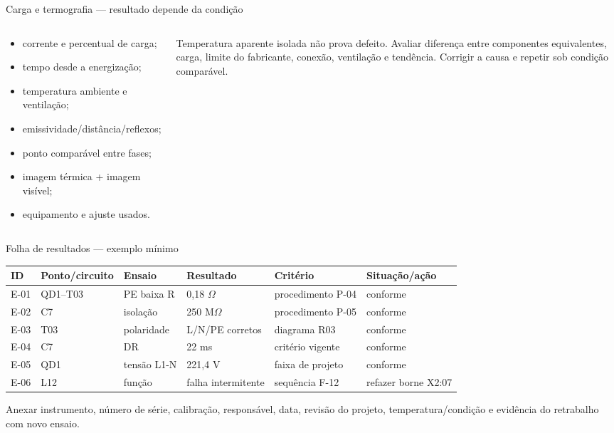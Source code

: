 \begin{frame}{Carga e termografia — resultado depende da condição}
\small
\begin{columns}[T,onlytextwidth]
\begin{caixaNorma}[title=Registrar a condição]
\begin{itemize}
\item corrente e percentual de carga;
\item tempo desde a energização;
\item temperatura ambiente e ventilação;
\item emissividade/distância/reflexos;
\item ponto comparável entre fases;
\item imagem térmica + imagem visível;
\item equipamento e ajuste usados.
\end{itemize}
\end{caixaNorma}
\begin{caixaAt}[title=Não concluir pelo “ponto vermelho”]
Temperatura aparente isolada não prova defeito. Avaliar diferença entre componentes equivalentes, carga, limite do fabricante, conexão, ventilação e tendência. Corrigir a causa e repetir sob condição comparável.
\end{caixaAt}
\end{columns}
\end{frame}

\begin{frame}{Folha de resultados — exemplo mínimo}
\scriptsize
\begin{tabularx}{\textwidth}{p{1.2cm}p{2.1cm}p{1.8cm}p{1.8cm}p{1.8cm}X}
\toprule
ID & Ponto/circuito & Ensaio & Resultado & Critério & Situação/ação \\
\midrule
E-01 & QD1--T03 & PE baixa R & 0,18 $\Omega$ & procedimento P-04 & conforme \\
E-02 & C7 & isolação & 250 M$\Omega$ & procedimento P-05 & conforme \\
E-03 & T03 & polaridade & L/N/PE corretos & diagrama R03 & conforme \\
E-04 & C7 & DR & 22 ms & critério vigente & conforme \\
E-05 & QD1 & tensão L1-N & 221,4 V & faixa de projeto & conforme \\
E-06 & L12 & função & falha intermitente & sequência F-12 & refazer borne X2:07 \\
\bottomrule
\end{tabularx}
\vspace{2mm}
\begin{caixaObs}
Anexar instrumento, número de série, calibração, responsável, data, revisão do projeto, temperatura/condição e evidência do retrabalho com novo ensaio.
\end{caixaObs}
\end{frame}

